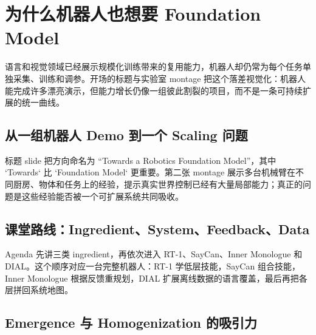 \section{为什么机器人也想要 Foundation Model}

语言和视觉领域已经展示规模化训练带来的复用能力，机器人却仍常为每个任务单独采集、训练和调参。开场的标题与实验室 montage 把这个落差视觉化：机器人能完成许多漂亮演示，但能力增长仍像一组彼此割裂的项目，而不是一条可持续扩展的统一曲线。

\subsection{从一组机器人 Demo 到一个 Scaling 问题}

标题 slide 把方向命名为 “Towards a Robotics Foundation Model”，其中 `Towards` 比 `Foundation Model` 更重要。第二张 montage 展示多台机械臂在不同厨房、物体和任务上的经验，提示真实世界控制已经有大量局部能力；真正的问题是这些经验能否被一个可扩展系统共同吸收。




\subsection{课堂路线：Ingredient、System、Feedback、Data}

Agenda 先讲三类 ingredient，再依次进入 RT-1、SayCan、Inner Monologue 和 DIAL。这个顺序对应一台完整机器人：RT-1 学低层技能，SayCan 组合技能，Inner Monologue 根据反馈重规划，DIAL 扩展离线数据的语言覆盖，最后再把各层拼回系统地图。


\subsection{Emergence 与 Homogenization 的吸引力}

